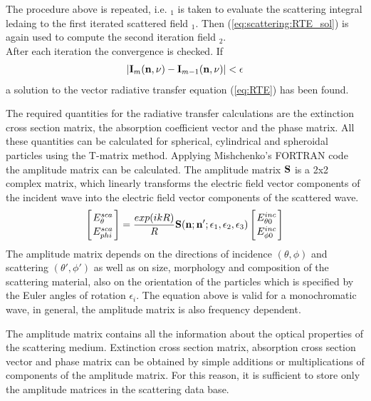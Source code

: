 \label{sec:scattering:conv}

The procedure above is repeated, i.e. \StoVec$_1$ is taken to evaluate
the scattering integral ledaing to the first iterated scattered field
\ScaInt$_1$. Then (\ref{eq:scattering:RTE_sol}) is again used to compute the
second iteration field \StoVec$_2$. \\
After each iteration the convergence is checked. If 
\begin{eqnarray}
|{\bf I}_m ({\bf n}, \nu) -  {\bf I}_{m-1} ({\bf n}, \nu)| < \epsilon
\end{eqnarray}
a solution to the vector radiative transfer equation (\ref{eq:RTE})
has been
found.

\label{sec:scat_database}

The required quantities for the radiative transfer calculations are
the  extinction cross section matrix, the
absorption coefficient vector and the phase
matrix. All these quantities can be calculated for spherical,
cylindrical and spheroidal particles using the T-matrix
method. Applying Mishchenko's FORTRAN code the amplitude matrix can be calculated. The
amplitude matrix ${\bf S}$ is a 2x2 complex matrix, which linearly transforms 
the electric field vector components of the incident wave into the
electric field vector components of the scattered wave.  
\begin{eqnarray}
  \label{eq:ampl_matrix}
  \left[{E^{sca}_{\theta}\atop E^{sca}_{phi}}\right] =
  \frac{exp(ikR)}{R}{\bf S}({\bf n};{\bf
      n'};\epsilon_1,\epsilon_2,\epsilon_3)\left[{E^{inc}_{\theta
          0}\atop E^{inc}_{\phi 0}}\right] 
\end{eqnarray}
The amplitude matrix depends on the directions of incidence  $(\theta,
\phi)$  and
scattering $(\theta', \phi')$ as  well as on size, morphology and composition of the
scattering material, also on the orientation of the particles which
is specified by the Euler angles of rotation $\epsilon _i$. 
The equation above is valid for a monochromatic wave, in general, the
amplitude matrix is also frequency dependent.

The amplitude matrix contains all the information about the optical
properties of the scattering medium. Extinction cross section
matrix, absorption cross section vector and phase matrix can be
obtained by simple additions or multiplications 
of components of the amplitude matrix. 
For this reason, it is sufficient to store only the amplitude matrices
in the scattering data base. 

